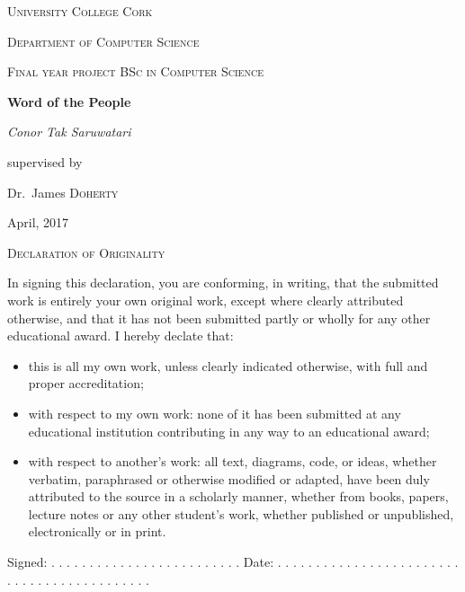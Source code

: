 \documentclass[12pt,a4paper]{report}
\begin{document}
\begin{titlepage}
  \centering
  {\scshape\LARGE University College Cork \par}
  \vspace{1cm}
  {\scshape\Large Department of Computer Science\par}
  {\scshape\Large Final year project BSc in Computer Science\par}
  \vspace{1.5cm}
  {\huge\bfseries Word of the People\par}
  \vspace{2cm}
  {\Large\itshape Conor Tak Saruwatari\par}
  \vfill
  supervised by\par
  Dr.~James \textsc{Doherty}

  \vfill

  {\large April, 2017\par}

\end{titlepage}
{\scshape\LARGE Declaration of Originality \par}
  \vspace{1cm}
  In signing this declaration, you are conforming, in writing, that the submitted work is entirely your own original work, except where clearly attributed otherwise, and that it has not been submitted partly or wholly for any other educational award.
  \linebreak
  I hereby declate that: 
  \begin{itemize}
    \item this is all my own work, unless clearly indicated otherwise, with full and proper accreditation;
    \item with respect to my own work: none of it has been submitted at any educational institution contributing in any way to an educational award;
    \item with respect to another’s work: all text, diagrams, code, or ideas, whether verbatim, paraphrased or otherwise modified or adapted, have been duly attributed to the source in a scholarly manner, whether from books, papers, lecture notes or any other student’s work, whether published or unpublished, electronically or in print.
  \end{itemize}
  Signed: . . . . . . . . . . . . . . . . . . . . . . . . . 
  \linebreak
  Date: . . . . . . . . . . . . . . . . . . . . . . . . . . . . . . . . . . . . . . . . . . .
\end{document}
